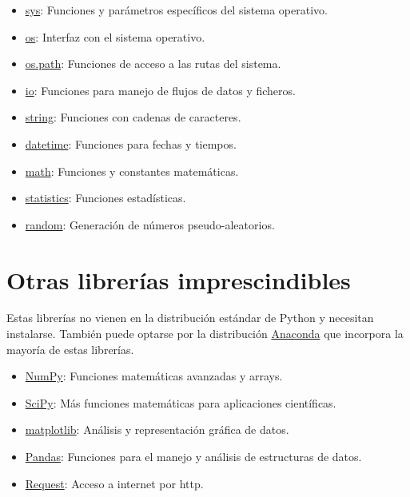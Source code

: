 \documentclass[
  spanish,
  a4paper,
]{scrreport}
\providecommand{\tightlist}{%
  \setlength{\itemsep}{0pt}\setlength{\parskip}{0pt}}
\begin{document}
\begin{itemize}
\tightlist
\item
  \href{https://docs.python.org/3/library/sys.html}{sys}: Funciones y
  parámetros específicos del sistema operativo.
\item
  \href{https://docs.python.org/3/library/os.html}{os}: Interfaz con el
  sistema operativo.
\item
  \href{https://docs.python.org/3/library/os.path.html}{os.path}:
  Funciones de acceso a las rutas del sistema.
\item
  \href{https://docs.python.org/3/library/io.html}{io}: Funciones para
  manejo de flujos de datos y ficheros.
\item
  \href{https://docs.python.org/3/library/string.html}{string}:
  Funciones con cadenas de caracteres.
\item
  \href{https://docs.python.org/3/library/datetime.html}{datetime}:
  Funciones para fechas y tiempos.
\item
  \href{https://docs.python.org/3/library/math.html}{math}: Funciones y
  constantes matemáticas.
\item
  \href{https://docs.python.org/3/library/statistics.html}{statistics}:
  Funciones estadísticas.
\item
  \href{https://docs.python.org/3/library/random.html}{random}:
  Generación de números pseudo-aleatorios.
\end{itemize}

\section{Otras librerías
imprescindibles}\label{otras-libreruxedas-imprescindibles}

Estas librerías no vienen en la distribución estándar de Python y
necesitan instalarse. También puede optarse por la distribución
\href{https://www.anaconda.com/}{Anaconda} que incorpora la mayoría de
estas librerías.

\begin{itemize}
\tightlist
\item
  \href{https://www.numpy.org/}{NumPy}: Funciones matemáticas avanzadas
  y arrays.
\item
  \href{https://www.scipy.org/}{SciPy}: Más funciones matemáticas para
  aplicaciones científicas.
\item
  \href{https://matplotlib.org/}{matplotlib}: Análisis y representación
  gráfica de datos.
\item
  \href{https://pandas.pydata.org/}{Pandas}: Funciones para el manejo y
  análisis de estructuras de datos.
\item
  \href{http://www.python-requests.org/en/master/}{Request}: Acceso a
  internet por http.
\end{itemize}
\end{document}
